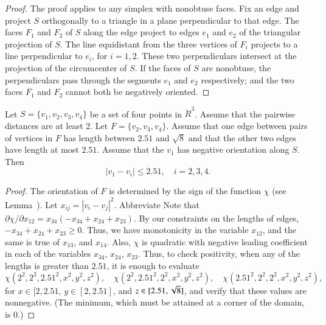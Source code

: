 \begin{proof}
The proof applies to any simplex with nonobtuse faces. 
Fix an edge and project $S$ orthogonally
to a triangle in a plane perpendicular to that edge. The faces
$F_1$ and $F_2$ of $S$ along the edge project to edges $e_1$ and
$e_2$ of the triangular projection of $S$. The line equidistant
from the three vertices of $F_i$ projects to a line perpendicular
to $e_i$, for $i=1,2$. These two perpendiculars intersect at the
projection of the circumcenter of $S$.  If the faces of $S$ are
nonobtuse, the perpendiculars pass through the segments $e_1$ and
$e_2$ respectively; and the two faces $F_1$ and $F_2$ cannot both
be negatively oriented.
\end{proof}


\newpage
\begin{lemma}
Let $S=\{v_1,v_2,v_3,v_4\}$ be a set of four points in $\ring{R}^3$.
Assume that the pairwise distances are at least $2$.
Let $F=\{v_2,v_3,v_4\}$.
Assume that one edge between
pairs of vertices in $F$
has length between $2.51$ and $\sqrt8$ and that
the other two edges have length at most $2.51$.  
Assume that the $v_1$ has negative orientation
along $S$. Then
   $$
   |v_1-v_i|\le 2.51, \quad i=2,3,4.
   $$
\end{lemma}

\begin{proof}  
The orientation of $F$ is determined by the sign of the function
$\chi$ (see Lemma~). 
Let $x_{ij}=|v_i-v_j|^2$.  Abbreviate
Note that $\partial\chi/\partial x_{12} = x_{34}
(-x_{34}+x_{24}+x_{23})$.  By our
constraints on the lengths of edges, 
$-x_{34}+x_{24}+x_{23}\ge0$. Thus, we have monotonicity in the variable $x_{12}$,
and the same is true of $x_{13}$, and $x_{14}$. Also, $\chi$ is
quadratic with negative leading coefficient in each of the
variables $x_{34}$, $x_{24}$, $x_{23}$. Thus, to check positivity, when any
of the lengths is greater than $2.51$, it is enough to evaluate
$$\chi(2^2,2^2,2.51^2,x^2,y^2,z^2), \quad
\chi(2^2,2.51^2,2^2,x^2,y^2,z^2),  \quad
\chi(2.51^2,2^2,2^2,x^2,y^2,z^2),$$ for $x\in[2,2.51$,
$y\in[2,2.51]$, and $z\in[2.51,\sqrt8]$, and verify that these
values are nonnegative. (The minimum, which must be attained at a
corner of the domain, is  $0$.)
\end{proof}

